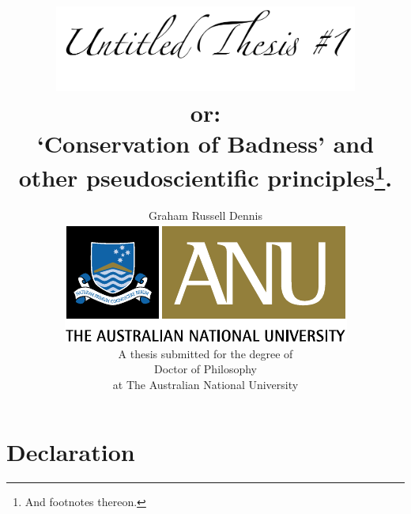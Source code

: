 \documentclass[twoside,onecolumn,11pt,a4paper,final]{book}
\begin{document}

\begin{titlepage}
\graphicspath{{Figures/TitlePage/}{Figures/Common/}}
\title{\includegraphics[width=10cm]{UntitledTitle}\\
        or:\\
        `Conservation of Badness' and other pseudoscientific principles\footnote{And footnotes thereon.}.}
 \author{Graham Russell Dennis\\[6cm]
 \includegraphics{ANU_PMS}\\[2cm]
  A thesis submitted for the degree of\\
  Doctor of Philosophy\\
  at The Australian National University\\[1cm]}
\maketitle
\end{titlepage}

\sloppy



\chapter*{Declaration}
\end{document}
